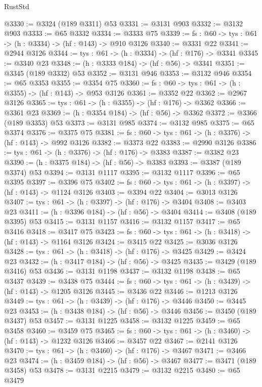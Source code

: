 \begin{lexlean}{RustStd}
\begin{coremodule}
{\begin{coremodule}
{{{{{{{{{{{{@3330 := @3324 (@189 @3311) @53
@3331 := @3131 @903
@3332 := @3132 @903
@3333 := @65 @3332
@3334 := @3333 @75
@3339 := {fs : @60} -> {tys : @61} -> (h : @3334) -> (hf : @143) -> @910 @3126
@3340 := @3331 @22
@3341 := @2944 @3126
@3344 := {tys : @61} -> (h : @3334) -> (hf : @176) -> @3341
@3345 := @3340 @23
@3348 := (h : @3333 @184) -> (hf : @56) -> @3341
@3351 := @3345 (@189 @3332) @53
@3352 := @3131 @946
@3353 := @3132 @946
@3354 := @65 @3353
@3355 := @3354 @75
@3360 := {fs : @60} -> {tys : @61} -> (h : @3355) -> (hf : @143) -> @953 @3126
@3361 := @3352 @22
@3362 := @2967 @3126
@3365 := {tys : @61} -> (h : @3355) -> (hf : @176) -> @3362
@3366 := @3361 @23
@3369 := (h : @3354 @184) -> (hf : @56) -> @3362
@3372 := @3366 (@189 @3353) @53
@3373 := @3131 @985
@3374 := @3132 @985
@3375 := @65 @3374
@3376 := @3375 @75
@3381 := {fs : @60} -> {tys : @61} -> (h : @3376) -> (hf : @143) -> @992 @3126
@3382 := @3373 @22
@3383 := @2990 @3126
@3386 := {tys : @61} -> (h : @3376) -> (hf : @176) -> @3383
@3387 := @3382 @23
@3390 := (h : @3375 @184) -> (hf : @56) -> @3383
@3393 := @3387 (@189 @3374) @53
@3394 := @3131 @1117
@3395 := @3132 @1117
@3396 := @65 @3395
@3397 := @3396 @75
@3402 := {fs : @60} -> {tys : @61} -> (h : @3397) -> (hf : @143) -> @1124 @3126
@3403 := @3394 @22
@3404 := @3013 @3126
@3407 := {tys : @61} -> (h : @3397) -> (hf : @176) -> @3404
@3408 := @3403 @23
@3411 := (h : @3396 @184) -> (hf : @56) -> @3404
@3414 := @3408 (@189 @3395) @53
@3415 := @3131 @1157
@3416 := @3132 @1157
@3417 := @65 @3416
@3418 := @3417 @75
@3423 := {fs : @60} -> {tys : @61} -> (h : @3418) -> (hf : @143) -> @1164 @3126
@3424 := @3415 @22
@3425 := @3036 @3126
@3428 := {tys : @61} -> (h : @3418) -> (hf : @176) -> @3425
@3429 := @3424 @23
@3432 := (h : @3417 @184) -> (hf : @56) -> @3425
@3435 := @3429 (@189 @3416) @53
@3436 := @3131 @1198
@3437 := @3132 @1198
@3438 := @65 @3437
@3439 := @3438 @75
@3444 := {fs : @60} -> {tys : @61} -> (h : @3439) -> (hf : @143) -> @1205 @3126
@3445 := @3436 @22
@3446 := @1213 @3126
@3449 := {tys : @61} -> (h : @3439) -> (hf : @176) -> @3446
@3450 := @3445 @23
@3453 := (h : @3438 @184) -> (hf : @56) -> @3446
@3456 := @3450 (@189 @3437) @53
@3457 := @3131 @1225
@3458 := @3132 @1225
@3459 := @65 @3458
@3460 := @3459 @75
@3465 := {fs : @60} -> {tys : @61} -> (h : @3460) -> (hf : @143) -> @1232 @3126
@3466 := @3457 @22
@3467 := @2141 @3126
@3470 := {tys : @61} -> (h : @3460) -> (hf : @176) -> @3467
@3471 := @3466 @23
@3474 := (h : @3459 @184) -> (hf : @56) -> @3467
@3477 := @3471 (@189 @3458) @53
@3478 := @3131 @2215
@3479 := @3132 @2215
@3480 := @65 @3479
}}}}}}}}}}}}
\end{coremodule}}
\end{coremodule}
\end{lexlean}
